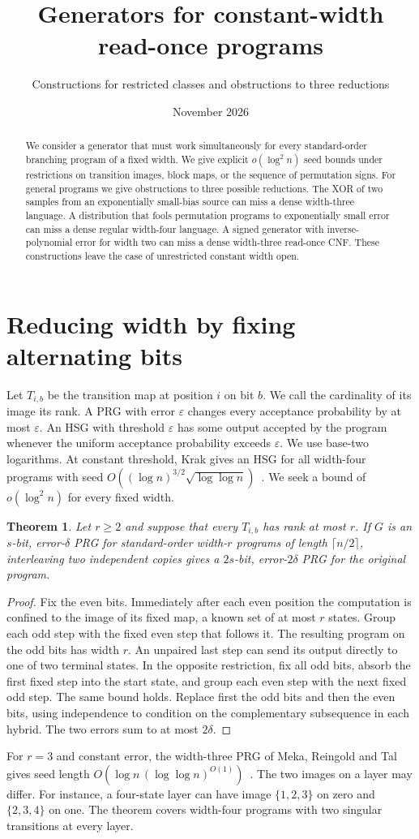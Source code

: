 \documentclass[11pt]{article}
\title{Generators for constant-width read-once programs}
\author{Constructions for restricted classes and obstructions to three reductions}
\date{November 2026}
\newtheorem{theorem}{Theorem}
\begin{document}
\maketitle
\begin{abstract}
We consider a generator that must work simultaneously for every standard-order branching program of a fixed width. We give explicit $o(\log^2 n)$ seed bounds under restrictions on transition images, block maps, or the sequence of permutation signs. For general programs we give obstructions to three possible reductions. The XOR of two samples from an exponentially small-bias source can miss a dense width-three language. A distribution that fools permutation programs to exponentially small error can miss a dense regular width-four language. A signed generator with inverse-polynomial error for width two can miss a dense width-three read-once CNF. These constructions leave the case of unrestricted constant width open.
\end{abstract}
\section{Reducing width by fixing alternating bits}
Let $T_{i,b}$ be the transition map at position $i$ on bit $b$. We call the cardinality of its image its rank. A PRG with error $\varepsilon$ changes every acceptance probability by at most $\varepsilon$. An HSG with threshold $\varepsilon$ has some output accepted by the program whenever the uniform acceptance probability exceeds $\varepsilon$. We use base-two logarithms. At constant threshold, Krak gives an HSG for all width-four programs with seed $O((\log n)^{3/2}\sqrt{\log\log n})$~\cite{Krak}. We seek a bound of $o(\log^2 n)$ for every fixed width.
\begin{theorem}\label{thm:rank}
Let $r\ge 2$ and suppose that every $T_{i,b}$ has rank at most $r$. If $G$ is an $s$-bit, error-$\delta$ PRG for standard-order width-$r$ programs of length $\lceil n/2\rceil$, interleaving two independent copies gives a $2s$-bit, error-$2\delta$ PRG for the original program.
\end{theorem}
\begin{proof}
Fix the even bits. Immediately after each even position the computation is confined to the image of its fixed map, a known set of at most $r$ states. Group each odd step with the fixed even step that follows it. The resulting program on the odd bits has width $r$. An unpaired last step can send its output directly to one of two terminal states. In the opposite restriction, fix all odd bits, absorb the first fixed step into the start state, and group each even step with the next fixed odd step. The same bound holds. Replace first the odd bits and then the even bits, using independence to condition on the complementary subsequence in each hybrid. The two errors sum to at most $2\delta$.
\end{proof}
For $r=3$ and constant error, the width-three PRG of Meka, Reingold and Tal gives seed length $O(\log n\,(\log\log n)^{O(1)})$~\cite{MRT}. The two images on a layer may differ. For instance, a four-state layer can have image $\{1,2,3\}$ on zero and $\{2,3,4\}$ on one. The theorem covers width-four programs with two singular transitions at every layer.
\end{document}
